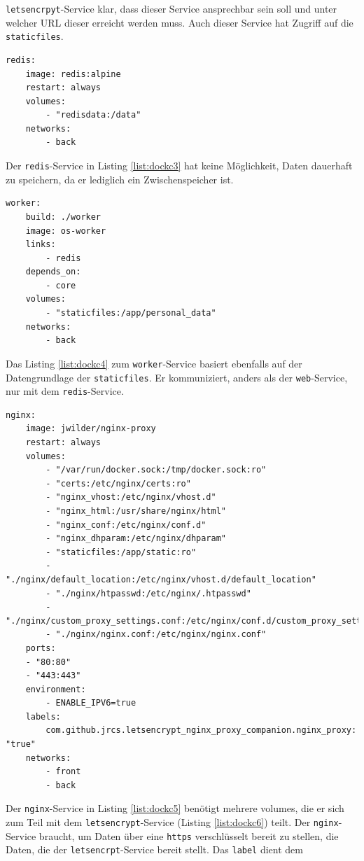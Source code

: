 \documentclass[11pt,a4paper]{article}
\begin{document}
\texttt{letsencrpyt}-Service klar, dass dieser Service ansprechbar sein soll 
und unter welcher URL dieser erreicht werden muss. Auch dieser Service hat 
Zugriff auf die \texttt{staticfiles}.
\newpage
\begin{lstlisting}[firstnumber=40,
	caption=\texttt{docker-compose.yml} Teil 3 - 
	\cite{osdockcont},
	label={list:dockc3}]
redis:
	image: redis:alpine
	restart: always
	volumes:
		- "redisdata:/data"
	networks:
		- back
\end{lstlisting}
Der \texttt{redis}-Service in Listing \ref{list:dockc3} hat keine Möglichkeit, 
Daten dauerhaft zu speichern, da er lediglich ein Zwischenspeicher ist.
\begin{lstlisting}[firstnumber=47,
	caption=\texttt{docker-compose.yml} Teil 4 - 
	\cite{osdockcont},
	label={list:dockc4}]
worker:
	build: ./worker
	image: os-worker
	links:
		- redis
	depends_on:
		- core
	volumes:
		- "staticfiles:/app/personal_data"
	networks:
		- back
\end{lstlisting}
Das Listing \ref{list:dockc4} zum \texttt{worker}-Service basiert ebenfalls auf 
der Datengrundlage der \texttt{staticfiles}. Er kommuniziert, anders als 
der \texttt{web}-Service, nur mit dem \texttt{redis}-Service.
\begin{lstlisting}[firstnumber=58,
	caption=\texttt{docker-compose.yml} Teil 5 - 
	\cite{osdockcont},
	label={list:dockc5}]
nginx:
	image: jwilder/nginx-proxy
	restart: always
	volumes:
		- "/var/run/docker.sock:/tmp/docker.sock:ro"
		- "certs:/etc/nginx/certs:ro"
		- "nginx_vhost:/etc/nginx/vhost.d"
		- "nginx_html:/usr/share/nginx/html"
		- "nginx_conf:/etc/nginx/conf.d"
		- "nginx_dhparam:/etc/nginx/dhparam"
		- "staticfiles:/app/static:ro"
		- "./nginx/default_location:/etc/nginx/vhost.d/default_location"
		- "./nginx/htpasswd:/etc/nginx/.htpasswd"
		- "./nginx/custom_proxy_settings.conf:/etc/nginx/conf.d/custom_proxy_settings.conf"
		- "./nginx/nginx.conf:/etc/nginx/nginx.conf"
	ports:
	- "80:80"
	- "443:443"
	environment:
		- ENABLE_IPV6=true
	labels:
		com.github.jrcs.letsencrypt_nginx_proxy_companion.nginx_proxy: "true"
	networks:
		- front
		- back
\end{lstlisting}
Der \texttt{nginx}-Service in Listing \ref{list:dockc5} benötigt mehrere 
volumes, die er sich zum Teil mit dem \texttt{letsencrypt}-Service (Listing 
\ref{list:dockc6}) teilt. Der \texttt{nginx}-Service braucht, um Daten über 
eine \texttt{https} verschlüsselt bereit zu stellen, die Daten, die der 
\texttt{letsencrpt}-Service bereit stellt. Das \texttt{label} dient dem 
\end{document}
